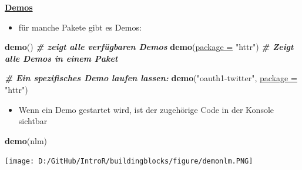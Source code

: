 \documentclass[ignorenonframetext,]{beamer}
\newenvironment{Shaded}{\begin{snugshade}}{\end{snugshade}}
\newcommand{\CommentTok}[1]{\textcolor[rgb]{0.00,0.40,1.00}{\textbf{\textit{#1}}}}
\newcommand{\DataTypeTok}[1]{\textcolor[rgb]{0.74,0.68,0.62}{\underline{#1}}}
\newcommand{\KeywordTok}[1]{\textcolor[rgb]{0.26,0.66,0.93}{\textbf{#1}}}
\newcommand{\NormalTok}[1]{\textcolor[rgb]{0.74,0.68,0.62}{#1}}
\newcommand{\StringTok}[1]{\textcolor[rgb]{0.02,0.61,0.04}{#1}}
\providecommand{\tightlist}{%
  \setlength{\itemsep}{0pt}\setlength{\parskip}{0pt}}
\begin{document}
\begin{frame}[fragile]{\href{http://r-pkgs.had.co.nz/demo.html}{\textbf{Demos}}}
\protect\hypertarget{demos}{}

\begin{itemize}
\tightlist
\item
  für manche Pakete gibt es Demos:
\end{itemize}

\begin{Shaded}
\begin{Highlighting}[]
\KeywordTok{demo}\NormalTok{() }\CommentTok{# zeigt alle verfügbaren Demos}
\KeywordTok{demo}\NormalTok{(}\DataTypeTok{package =} \StringTok{"httr"}\NormalTok{) }\CommentTok{# Zeigt alle Demos in einem Paket}

\CommentTok{# Ein spezifisches Demo laufen lassen:}
\KeywordTok{demo}\NormalTok{(}\StringTok{"oauth1-twitter"}\NormalTok{, }\DataTypeTok{package =} \StringTok{"httr"}\NormalTok{) }
\end{Highlighting}
\end{Shaded}

\begin{itemize}
\tightlist
\item
  Wenn ein Demo gestartet wird, ist der zugehörige Code in der Konsole
  sichtbar
\end{itemize}

\begin{Shaded}
\begin{Highlighting}[]
\KeywordTok{demo}\NormalTok{(nlm)}
\end{Highlighting}
\end{Shaded}

\texttt{[image: D:/GitHub/IntroR/buildingblocks/figure/demonlm.PNG]}

\end{frame}
\end{document}
